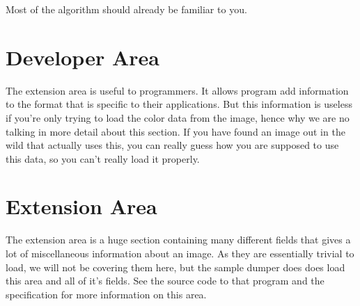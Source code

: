 \begin{refsection}
\begin{algorithm}[H]
\begin{algorithmic}[1]
              \process


            \EndRepeatn

          \Else



              \EndIf

              \process


            \EndRepeatn

          \EndIf
        \Else


          \EndIf

          \process


        \EndIf
      \EndWhile
    \end{algorithmic}
  \end{algorithm}

  Most of the algorithm should already be familiar to you.

  \section{Developer Area}

  The extension area is useful to programmers. It allows program add
  information to the \tga format that is specific to their
  applications. But this information is useless if you're only trying
  to load the color data from the \tga image, hence why we are no
  talking in more detail about this section. If you have found an
  \tga image out in the wild that actually uses this, you can really
  guess how you are supposed to use this data, so you can't really
  load it properly.

  \section{Extension Area}

  The extension area is a huge section containing many different
  fields that gives a lot of miscellaneous information about an
  image. As they are essentially trivial to load, we will not be
  covering them here, but the sample \tga dumper does does load this
  area and all of it's fields. See the source code to that program and
  the \tga specification for more information on this area.


\end{refsection}
